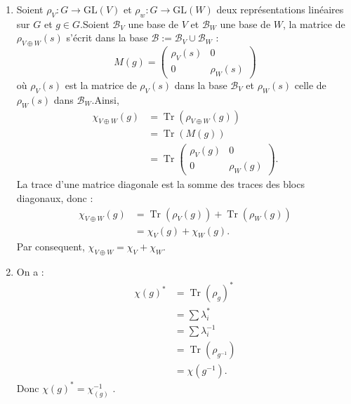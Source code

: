 \documentclass[a4paper, 14pt]{report}
\begin{document}
\begin{onehalfspace}
{\begin{enumerate}[label=\roman*)]
				\[
				\begin{aligned}
					\chi_V(1) &= \operatorname{Tr}(\rho(1)) \\
					&= \operatorname{Tr}(\mathrm{Id}_V) \\
					&= \dim V.
				\end{aligned}
				\]
				Donc \( \chi_V(1) = \dim V \).
				\item  Soient \( \rho_V : G \rightarrow \mathrm{GL}(V) \) et \( \rho_w : G \rightarrow \mathrm{GL}(W) \) deux représentations linéaires sur \(G\) et $g \in G$.Soient $\mathcal{B}_V$ une base de $V$ et $\mathcal{B}_W$ une base de $W$, la matrice de $\rho_{V \oplus W}(s)$ s'écrit dans la base $\mathcal{B} := \mathcal{B}_V \cup \mathcal{B}_W$ :
				\[
				M(g) = \begin{pmatrix} \rho_V(s) & 0 \\ 0 & \rho_W(s) \end{pmatrix}
				\]
				où $\rho_V(s)$ est la matrice de $\rho_V(s)$ dans la base $\mathcal{B}_V$ et $\rho_W(s)$ celle de $\rho_W(s)$ dans $\mathcal{B}_W$.Ainsi,
				\[
				\begin{aligned}
					\chi_{V \oplus W}(g) &= \operatorname{Tr}(\rho_{V \oplus W}(g)) \\
					&= \operatorname{Tr}(M(g)) \\
					&= \operatorname{Tr} \begin{pmatrix} \rho_V(g) & 0 \\ 0 & \rho_W(g) \end{pmatrix}.
				\end{aligned}
				\]
				La trace d'une matrice diagonale est la somme des traces des blocs diagonaux, donc :
				\[
				\begin{aligned}
					\chi_{V \oplus W}(g) &= \operatorname{Tr}(\rho_V(g)) + \operatorname{Tr}(\rho_W(g)) \\
					&= \chi_V(g) + \chi_W(g).
				\end{aligned}
				\]
				Par consequent, \( \chi_{V \oplus W} = \chi_V + \chi_W \).
				\item On a :
				\begin{align*}
					\chi(g)^* &= \operatorname{Tr}(\rho_g)^* \\
					&= \sum \lambda_i^* \\
					&= \sum \lambda_i^{-1} \\
					&= \operatorname{Tr}(\rho_{g^{-1}}) \\
					&= \chi(g^{-1}).
				\end{align*}
				Donc \( \chi{(g)^*} = {\chi_(g)^{-1}} \) \quad {}.	
			\end{enumerate}
			
}
\end{onehalfspace}
\end{document}
